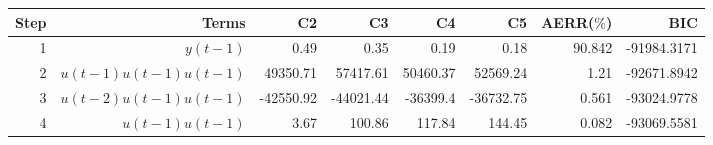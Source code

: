 \begin{tabular}{rrrrrrrr}
Step & Terms & C2 & C3 & C4 & C5 & AERR($\%$) & BIC \\ 
\hline 
1 & $y(t-1)$ & 0.49 & 0.35 & 0.19 & 0.18 & 90.842 & -91984.3171 \\ 
2 & $u(t-1)u(t-1)u(t-1)$ & 49350.71 & 57417.61 & 50460.37 & 52569.24 & 1.21 & -92671.8942 \\ 
3 & $u(t-2)u(t-1)u(t-1)$ & -42550.92 & -44021.44 & -36399.4 & -36732.75 & 0.561 & -93024.9778 \\ 
4 & $u(t-1)u(t-1)$ & 3.67 & 100.86 & 117.84 & 144.45 & 0.082 & -93069.5581 \\ 
\hline 
\end{tabular}